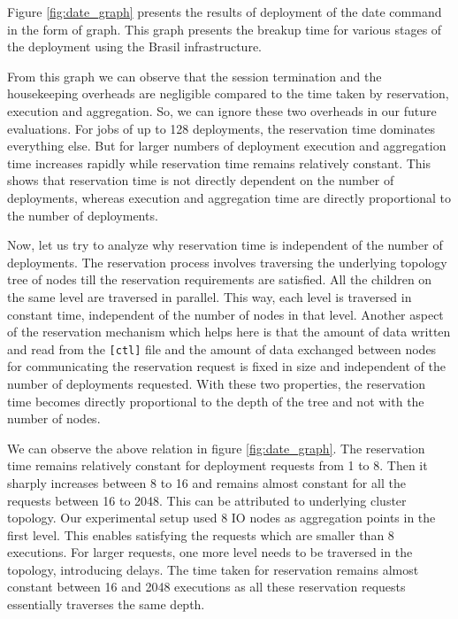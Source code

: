Figure \ref{fig:date_graph} presents the results of deployment of the date
command in the form of graph.  This graph presents the breakup time for various
stages of the deployment using the Brasil infrastructure.

From this graph we can observe that the session termination and the housekeeping
overheads are negligible compared to the time taken by reservation, execution
and aggregation.  So, we can ignore these two overheads in our future
evaluations.  For jobs of up to 128 deployments, the reservation time dominates
everything else.  But for larger numbers of deployment execution and
aggregation time increases rapidly while reservation time remains relatively
constant. This shows that reservation time is not directly dependent on
the number of deployments, whereas execution and aggregation time are directly
proportional to the number of deployments.

Now, let us try to analyze why reservation time is independent of the number of
deployments.  The reservation process involves traversing the underlying
topology tree of nodes till the reservation requirements are satisfied.  All the
children on the same level are traversed in parallel.  This way,
each level is traversed in constant time, independent of the number of nodes in
that level.  Another aspect of the reservation mechanism which helps here is
that the amount of data written and read from the \texttt{[ctl]} file and the
amount of data exchanged between nodes for communicating the reservation request is
fixed in size and independent of the number of deployments requested.  With
these two properties, the reservation time becomes directly proportional to the
depth of the tree and not with the number of nodes.

We can observe the above relation in figure \ref{fig:date_graph}. The 
reservation time remains relatively constant for deployment requests from 1 to
8.  Then it sharply increases between 8 to 16 and remains almost constant for
all the requests between 16 to 2048.  This can be attributed to underlying
cluster topology. 
Our experimental setup used 8 IO nodes as aggregation points in the first level. 
This enables satisfying the requests which are smaller
than 8 executions. For larger requests, one more level needs to be traversed
in the topology, introducing delays.  The time taken for reservation remains
almost constant between 16 and 2048 executions as all these reservation
requests essentially traverses the same depth.  


